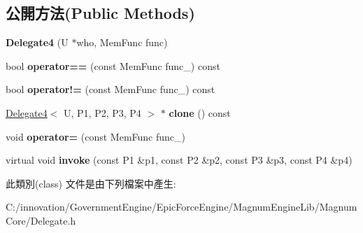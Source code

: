 \subsection*{公開方法(Public Methods)}
\begin{DoxyCompactItemize}
\item 
{\bfseries Delegate4} (U $\ast$who, Mem\+Func func)\hypertarget{class_i_dream_sky_1_1_delegate4_ac48d5946f5793781bc862cbc0dad67f0}{}\label{class_i_dream_sky_1_1_delegate4_ac48d5946f5793781bc862cbc0dad67f0}

\item 
bool {\bfseries operator==} (const Mem\+Func func\+\_\+) const \hypertarget{class_i_dream_sky_1_1_delegate4_acfed820070a5c5650736a71c55d0d570}{}\label{class_i_dream_sky_1_1_delegate4_acfed820070a5c5650736a71c55d0d570}

\item 
bool {\bfseries operator!=} (const Mem\+Func func\+\_\+) const \hypertarget{class_i_dream_sky_1_1_delegate4_aa351be3df3475b191d6bed03b7242153}{}\label{class_i_dream_sky_1_1_delegate4_aa351be3df3475b191d6bed03b7242153}

\item 
\hyperlink{class_i_dream_sky_1_1_delegate4}{Delegate4}$<$ U, P1, P2, P3, P4 $>$ $\ast$ {\bfseries clone} () const \hypertarget{class_i_dream_sky_1_1_delegate4_acd31f416ffaf0ce74bc496e9cf9bc789}{}\label{class_i_dream_sky_1_1_delegate4_acd31f416ffaf0ce74bc496e9cf9bc789}

\item 
void {\bfseries operator=} (const Mem\+Func func\+\_\+)\hypertarget{class_i_dream_sky_1_1_delegate4_adecef7f91f66cb98c61039a78e49feec}{}\label{class_i_dream_sky_1_1_delegate4_adecef7f91f66cb98c61039a78e49feec}

\item 
virtual void {\bfseries invoke} (const P1 \&p1, const P2 \&p2, const P3 \&p3, const P4 \&p4)\hypertarget{class_i_dream_sky_1_1_delegate4_abf8870e67061ac648d23607c15e0a4ab}{}\label{class_i_dream_sky_1_1_delegate4_abf8870e67061ac648d23607c15e0a4ab}

\end{DoxyCompactItemize}


此類別(class) 文件是由下列檔案中產生\+:\begin{DoxyCompactItemize}
\item 
C\+:/innovation/\+Government\+Engine/\+Epic\+Force\+Engine/\+Magnum\+Engine\+Lib/\+Magnum\+Core/Delegate.\+h\end{DoxyCompactItemize}
